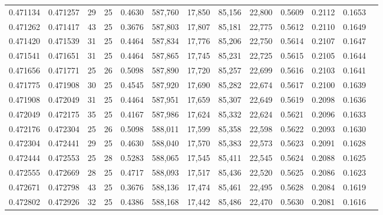 \begin{tabular}{rrrrrrrrrrrrr}
0.471134 & 0.471257 &    29 &  25 &                                     0.4630 & 587,760 &  17,850 &  85,156 &  22,800 & 0.5609 & 0.2112 & 0.1653 \\
0.471262 & 0.471417 &    43 &  25 &                                     0.3676 & 587,803 &  17,807 &  85,181 &  22,775 & 0.5612 & 0.2110 & 0.1649 \\
0.471420 & 0.471539 &    31 &  25 &                                     0.4464 & 587,834 &  17,776 &  85,206 &  22,750 & 0.5614 & 0.2107 & 0.1647 \\
0.471541 & 0.471651 &    31 &  25 &                                     0.4464 & 587,865 &  17,745 &  85,231 &  22,725 & 0.5615 & 0.2105 & 0.1644 \\
0.471656 & 0.471771 &    25 &  26 &                                     0.5098 & 587,890 &  17,720 &  85,257 &  22,699 & 0.5616 & 0.2103 & 0.1641 \\
0.471775 & 0.471908 &    30 &  25 &                                     0.4545 & 587,920 &  17,690 &  85,282 &  22,674 & 0.5617 & 0.2100 & 0.1639 \\
0.471908 & 0.472049 &    31 &  25 &                                     0.4464 & 587,951 &  17,659 &  85,307 &  22,649 & 0.5619 & 0.2098 & 0.1636 \\
0.472049 & 0.472175 &    35 &  25 &                                     0.4167 & 587,986 &  17,624 &  85,332 &  22,624 & 0.5621 & 0.2096 & 0.1633 \\
0.472176 & 0.472304 &    25 &  26 &                                     0.5098 & 588,011 &  17,599 &  85,358 &  22,598 & 0.5622 & 0.2093 & 0.1630 \\
0.472304 & 0.472441 &    29 &  25 &                                     0.4630 & 588,040 &  17,570 &  85,383 &  22,573 & 0.5623 & 0.2091 & 0.1628 \\
0.472444 & 0.472553 &    25 &  28 &                                     0.5283 & 588,065 &  17,545 &  85,411 &  22,545 & 0.5624 & 0.2088 & 0.1625 \\
0.472555 & 0.472669 &    28 &  25 &                                     0.4717 & 588,093 &  17,517 &  85,436 &  22,520 & 0.5625 & 0.2086 & 0.1623 \\
0.472671 & 0.472798 &    43 &  25 &                                     0.3676 & 588,136 &  17,474 &  85,461 &  22,495 & 0.5628 & 0.2084 & 0.1619 \\
0.472802 & 0.472926 &    32 &  25 &                                     0.4386 & 588,168 &  17,442 &  85,486 &  22,470 & 0.5630 & 0.2081 & 0.1616 \\

\end{tabular}
